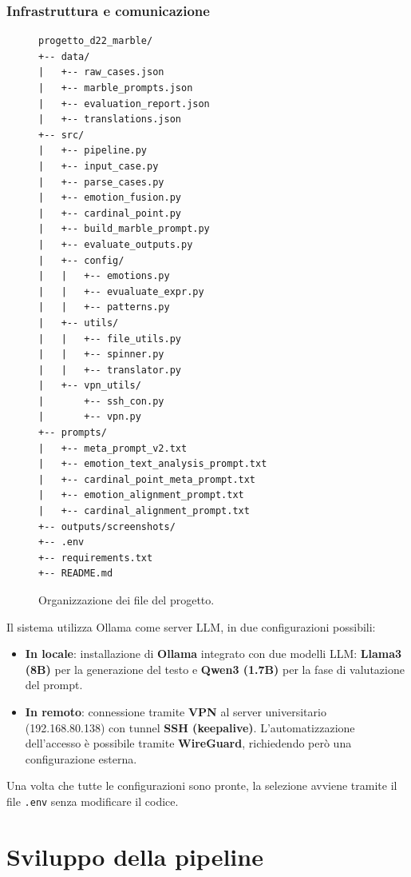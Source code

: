 \documentclass[11pt]{report}
\begin{document}
\subsection{Infrastruttura e comunicazione}
 
\begin{figure}[H]
\begin{verbatim}
progetto_d22_marble/
+-- data/
|   +-- raw_cases.json
|   +-- marble_prompts.json
|   +-- evaluation_report.json
|   +-- translations.json
+-- src/
|   +-- pipeline.py
|   +-- input_case.py
|   +-- parse_cases.py
|   +-- emotion_fusion.py
|   +-- cardinal_point.py
|   +-- build_marble_prompt.py
|   +-- evaluate_outputs.py
|   +-- config/
|   |   +-- emotions.py
|   |   +-- evualuate_expr.py
|   |   +-- patterns.py
|   +-- utils/
|   |   +-- file_utils.py
|   |   +-- spinner.py
|   |   +-- translator.py
|   +-- vpn_utils/
|       +-- ssh_con.py
|       +-- vpn.py
+-- prompts/
|   +-- meta_prompt_v2.txt
|   +-- emotion_text_analysis_prompt.txt
|   +-- cardinal_point_meta_prompt.txt
|   +-- emotion_alignment_prompt.txt
|   +-- cardinal_alignment_prompt.txt
+-- outputs/screenshots/
+-- .env
+-- requirements.txt
+-- README.md
\end{verbatim}
\caption{Organizzazione dei file del progetto.}
\end{figure}

Il sistema utilizza Ollama come server LLM, in due configurazioni possibili:
\begin{itemize}
\item \textbf{In locale}: installazione di \textbf{Ollama} integrato con due modelli LLM: \textbf{Llama3 (8B)} per la generazione del testo e \textbf{Qwen3 (1.7B)} per la fase di valutazione del prompt.
\item \textbf{In remoto}: connessione tramite \textbf{VPN} al server universitario (192.168.80.138) con tunnel \textbf{SSH (keepalive)}. L'automatizzazione dell'accesso è possibile tramite \textbf{WireGuard}, richiedendo però una configurazione esterna.
\end{itemize}
 
Una volta che tutte le configurazioni sono pronte, la selezione avviene tramite il file \texttt{.env} senza modificare il codice.

 
\chapter{Sviluppo della pipeline}
\label{ch:sviluppo}
 
\end{document}
